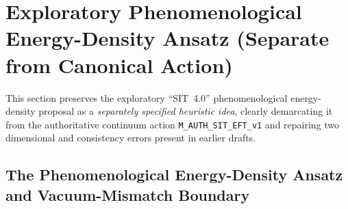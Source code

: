 \section{Exploratory Phenomenological Energy-Density Ansatz (Separate from Canonical Action)}
\label{sec:informational_energy_equivalence}

This section preserves the exploratory ``SIT~4.0'' phenomenological energy-density proposal as a \emph{separately specified heuristic idea}, clearly demarcating it from the authoritative continuum action \texttt{M\_AUTH\_SIT\_EFT\_v1} and repairing two dimensional and consistency errors present in earlier drafts.

\subsection{The Phenomenological Energy-Density Ansatz and Vacuum-Mismatch Boundary}

